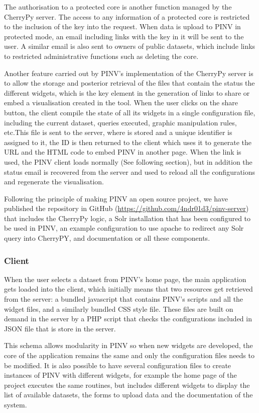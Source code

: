 The authorisation to a protected core is another function managed by the CherryPy server. The access to any information of a protected core is restricted to the inclusion of the key into the request. When data is upload to PINV in protected mode, an email including links with the key in it will be sent to the user. A similar email is also sent to owners of public datasets, which include links to restricted administrative functions such as deleting the core.

Another feature carried out by PINV's implementation of the CherryPy server is to allow the storage and posterior retrieval of the files that contain the status the different widgets, which is the key element in the generation of links to share or embed a visualisation created in the tool. When the user clicks on the share button, the client compile the state of all its widgets in a single configuration file, including the current dataset, queries executed, graphic manipulation rules, etc.This file is sent to the server, where is stored and a unique identifier is assigned to it, the ID is then returned to the client which uses it to generate the URL and the HTML code to embed PINV in another page. When the link is used, the PINV client loads normally (See following section), but in addition the status email is recovered from the server and used to reload all the configurations and regenerate the visualisation.

Following the principle of making PINV an open source project, we have published the repository in GitHub (\url{https://github.com/4ndr01d3/pinv-server}) that includes the CherryPy logic, a Solr installation that has been configured to be used in PINV, an example configuration to use apache to redirect any Solr query into CherryPY, and documentation or all these components.

\subsubsection{Client}
When the user selects a dataset from PINV's home page, the main application gets loaded into the client, which initially means that two resources get retrieved from the server: a bundled javascript that contains PINV's scripts and all the widget files, and a similarly bundled CSS style file. These files are built on demand in the server by a PHP script that checks the configurations included in JSON file that is store in the server. 

This schema allows modularity in PINV so when new widgets are developed, the core of the application remains the same and only the configuration files needs to be modified. It is also possible to have several configuration files to create instances of PINV with different widgets, for example the home page of the project executes the same routines, but includes different widgets to display the list of available datasets, the forms to upload data and the documentation of the system.

